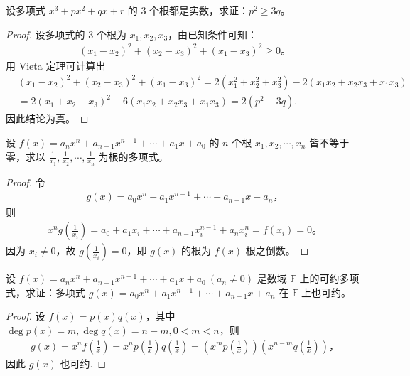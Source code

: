 \documentclass[../../main.tex]{subfiles}%
\begin{document}
\begin{example}
设多项式 $x^3 + px^2 + qx + r$ 的 3 个根都是实数，求证：$p^2 \geqslant  3q$。
\end{example}
\begin{proof}

设多项式的 3 个根为 $x_1, x_2, x_3$，由已知条件可知：
\begin{align*}
(x_1 - x_2)^2 + (x_2 - x_3)^2 + (x_1 - x_3)^2 \geqslant  0。
\end{align*}
用 Vieta 定理可计算出
\begin{align*}
&(x_1-x_2)^2+(x_2-x_3)^2+(x_1-x_3)^2=2\left( x_{1}^{2}+x_{2}^{2}+x_{3}^{2} \right) -2\left( x_1x_2+x_2x_3+x_1x_3 \right) 
\\
&=2\left( x_1+x_2+x_3 \right) ^2-6\left( x_1x_2+x_2x_3+x_1x_3 \right) =2(p^2-3q).
\end{align*}
因此结论为真。

\end{proof}

\begin{example}
设 $f(x) = a_n x^n + a_{n-1} x^{n-1} + \cdots + a_1 x + a_0$ 的 $n$ 个根 $x_1, x_2, \cdots, x_n$ 皆不等于零，求以 $\frac{1}{x_1}, \frac{1}{x_2}, \cdots, \frac{1}{x_n}$ 为根的多项式。
\end{example}
\begin{proof}

令
\begin{align*}
g(x) = a_0 x^n + a_1 x^{n-1} + \cdots + a_{n-1} x + a_n，
\end{align*}
则
\begin{align*}
x^n g\left(\frac{1}{x_i}\right) = a_0 + a_1 x_i + \cdots + a_{n-1} x_i^{n-1} + a_n x_i^n = f(x_i) = 0。
\end{align*}
因为 $x_i \neq 0$，故 $g\left(\frac{1}{x_i}\right) = 0$，即 $g(x)$ 的根为 $f(x)$ 根之倒数。

\end{proof}

\begin{example}
设 $f(x) = a_n x^n + a_{n-1} x^{n-1} + \cdots + a_1 x + a_0 \ (a_n \neq 0)$ 是数域 $\mathbb{F}$ 上的可约多项式，求证：多项式 $g(x) = a_0 x^n + a_1 x^{n-1} + \cdots + a_{n-1} x + a_n$ 在 $\mathbb{F}$ 上也可约。
\end{example}
\begin{proof}

设 $f(x) = p(x) q(x)$，其中 $\deg p(x) = m, \deg q(x) = n - m, 0 < m < n$，则
\begin{align*}
g(x) = x^n f\left(\frac{1}{x}\right) = x^n p\left(\frac{1}{x}\right) q\left(\frac{1}{x}\right) = \left(x^m p\left(\frac{1}{x}\right)\right) \left(x^{n-m} q\left(\frac{1}{x}\right)\right)，
\end{align*}
因此 $g(x)$ 也可约.

\end{proof}
\end{document}
